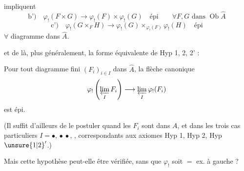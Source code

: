 
impliquent
\[
\text{b')}\quad\varphi_!(F\times G)\longrightarrow\varphi_!(F)\times\varphi_!(G)\quad\text{épi}
\qquad\forall F,G\text{ dans }\operatorname{Ob}\widehat A
\]
\[
\text{c')}\quad\varphi_!(G\times_F H)\longrightarrow
\varphi_!(G)\times_{\varphi_!(F)}\varphi_!(H)\quad\text{épi}
\]
$\forall$ diagramme
dans $\widehat A$.

et de là, plus généralement, la forme équivalente  de Hyp 1, 2, 2' :

Pour tout diagramme fini $(F_i)_{i\in I}$ dans $\widehat A$, la flèche canonique
\[
\varphi_!\left(\varprojlim_I F_i\right)\longrightarrow\varprojlim_I\varphi_!(F_i)
\]
est épi.

(Il suffit d'ailleurs de le postuler quand les $F_i$ sont dans $A$, et dans les trois cas particuliers $I=\bullet$, $\bullet\ \bullet$,
\diagram{\begin{tikzcd}[ampersand replacement=\&,column sep=tiny,row sep=tiny]
\bullet\arrow[dr]\&\&\bullet\arrow[dl]\\
\&\bullet\&
\end{tikzcd}}, correspondants aux axiomes Hyp 1, Hyp 2, Hyp $\unsure{1|2}'$.)

Mais cette hypothèse peut-elle être vérifiée, sans que $\varphi_!$ soit $=$ ex. à gauche ?

